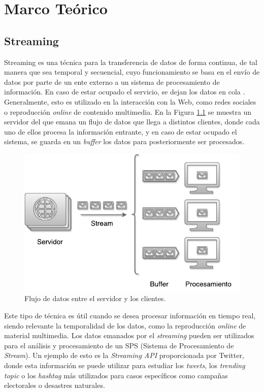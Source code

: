 \chapter{Marco Te\'orico}
\label{cap:marcoTeorico}

\section{Streaming}
\label{sec:streaming}

Streaming es una t\'ecnica para la transferencia de datos de forma continua, de tal manera que sea temporal y secuencial, cuyo funcionamiento se basa en el env\'io de datos por parte de un ente externo a un sistema de procesamiento de informaci\'on. \normalsize{En caso} de estar ocupado el servicio, se dejan los datos en cola \citep{Menin2002SMH}. Generalmente, esto es utilizado en la interacci\'on con la Web, como redes sociales o reproducci\'on \textit{online} de contenido multimedia. En la Figura \ref{fig:streaming} se muestra un servidor \normalsize{del} que emana un flujo de datos que llega a distintos clientes, donde cada uno de ellos procesa la informaci\'on entrante, y en caso de estar ocupado el sistema, se guarda en un \textit{buffer} los datos para posteriormente ser procesados.

\begin{figure}[ht!]
  \centering
    \includegraphics[scale=0.7]{images/Streaming.pdf}
  \caption{Flujo de datos entre el servidor y los clientes.}
  \label{fig:streaming}
\end{figure}

Este tipo de t\'ecnica es \'util cuando se desea procesar informaci\'on en tiempo real, siendo relevante la temporalidad de los datos, como la reproducci\'on \textit{online} de material multimedia. Los datos emanados por el \textit{streaming} pueden ser utilizados para el an\'alisis y procesamiento de un SPS (Sistema de Procesamiento de \textit{Stream}). Un ejemplo de esto es la \textit{Streaming API} proporcionada por Twitter, donde esta informaci\'on se puede utilizar para estudiar los \textit{tweets}, los \textit{trending topic} o los \textit{hashtag} m\'as utilizados para casos espec\'ificos como campa\~nas electorales o desastres naturales.


